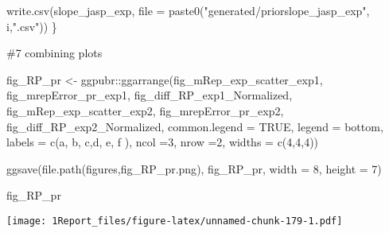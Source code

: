 \documentclass[
]{article}
\newenvironment{Shaded}{\begin{snugshade}}{\end{snugshade}}
\newcommand{\AttributeTok}[1]{\textcolor[rgb]{0.77,0.63,0.00}{#1}}
\newcommand{\ConstantTok}[1]{\textcolor[rgb]{0.00,0.00,0.00}{#1}}
\newcommand{\DecValTok}[1]{\textcolor[rgb]{0.00,0.00,0.81}{#1}}
\newcommand{\FunctionTok}[1]{\textcolor[rgb]{0.00,0.00,0.00}{#1}}
\newcommand{\NormalTok}[1]{#1}
\newcommand{\OtherTok}[1]{\textcolor[rgb]{0.56,0.35,0.01}{#1}}
\newcommand{\SpecialCharTok}[1]{\textcolor[rgb]{0.00,0.00,0.00}{#1}}
\newcommand{\StringTok}[1]{\textcolor[rgb]{0.31,0.60,0.02}{#1}}
\begin{document}
\begin{Shaded}
\begin{Highlighting}[]
  \FunctionTok{write.csv}\NormalTok{(slope\_jasp\_exp, }\AttributeTok{file =} \FunctionTok{paste0}\NormalTok{(}\StringTok{"generated/priorslope\_jasp\_exp"}\NormalTok{, i,}\StringTok{".csv"}\NormalTok{))}
\NormalTok{\}}
\end{Highlighting}
\end{Shaded}

\#7 combining plots

\begin{Shaded}
\begin{Highlighting}[]
\NormalTok{fig\_RP\_pr }\OtherTok{\textless{}{-}}\NormalTok{ ggpubr}\SpecialCharTok{::}\FunctionTok{ggarrange}\NormalTok{(fig\_mRep\_exp\_scatter\_exp1, fig\_mrepError\_pr\_exp1, fig\_diff\_RP\_exp1\_Normalized, fig\_mRep\_exp\_scatter\_exp2, fig\_mrepError\_pr\_exp2, fig\_diff\_RP\_exp2\_Normalized, }\AttributeTok{common.legend =} \ConstantTok{TRUE}\NormalTok{, }\AttributeTok{legend =} \StringTok{\textquotesingle{}bottom\textquotesingle{}}\NormalTok{, }\AttributeTok{labels =} \FunctionTok{c}\NormalTok{(}\StringTok{\textquotesingle{}a\textquotesingle{}}\NormalTok{, }\StringTok{\textquotesingle{}b\textquotesingle{}}\NormalTok{, }\StringTok{\textquotesingle{}c\textquotesingle{}}\NormalTok{,}\StringTok{\textquotesingle{}d\textquotesingle{}}\NormalTok{, }\StringTok{\textquotesingle{}e\textquotesingle{}}\NormalTok{, }\StringTok{\textquotesingle{}f\textquotesingle{}}\NormalTok{ ), }\AttributeTok{ncol =}\DecValTok{3}\NormalTok{, }\AttributeTok{nrow =}\DecValTok{2}\NormalTok{, }\AttributeTok{widths =} \FunctionTok{c}\NormalTok{(}\DecValTok{4}\NormalTok{,}\DecValTok{4}\NormalTok{,}\DecValTok{4}\NormalTok{))}

\FunctionTok{ggsave}\NormalTok{(}\FunctionTok{file.path}\NormalTok{(}\StringTok{\textquotesingle{}figures\textquotesingle{}}\NormalTok{,}\StringTok{\textquotesingle{}fig\_RP\_pr.png\textquotesingle{}}\NormalTok{), fig\_RP\_pr, }\AttributeTok{width =} \DecValTok{8}\NormalTok{, }\AttributeTok{height =} \DecValTok{7}\NormalTok{)}

\NormalTok{fig\_RP\_pr}
\end{Highlighting}
\end{Shaded}

\texttt{[image: 1Report\_files/figure-latex/unnamed-chunk-179-1.pdf]}
\end{document}
